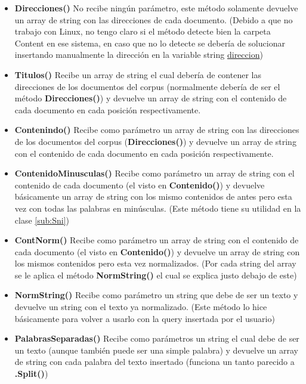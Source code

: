 \documentclass[a4paper,12pt]{article}
\begin{document}
\begin{itemize}
    \item \textbf{Direcciones()}
No recibe ningún parámetro, este método solamente devuelve un array de string con las direcciones de cada documento. (Debido a que no trabajo con Linux, no 
tengo claro si el método detecte bien la carpeta Content en ese sistema, en caso que no lo detecte se debería de solucionar insertando manualmente la dirección 
en la variable string \underline{direccion})

    \item \textbf{Titulos()}
Recibe un array de string el cual debería de contener las direcciones de los documentos del corpus (normalmente debería de ser el método \textbf{Direcciones()}) y devuelve un array de string con el contenido de cada documento en cada posición respectivamente.

     \item \textbf{Contenindo()}
Recibe como parámetro un array de string con las direcciones de los documentos del corpus (\textbf{Direcciones()}) y devuelve un array de string con el contenido de cada documento en cada posición respectivamente.

    \item \textbf{ContenidoMinusculas()}
Recibe como parámetro un array de string con el contenido de cada documento (el visto en \textbf{Contenido()}) y devuelve básicamente un array de string con 
los mismo contenidos de antes pero esta vez con todas las palabras en minúsculas. (Este método tiene su utilidad en la clase \ref{sub:Sni})  

    \item \textbf{ContNorm()}
Recibe como parámetro un array de string con el contenido de cada documento (el visto en \textbf{Contenido()}) y devuelve un array de string con los mismos 
contenidos pero esta vez normalizados. (Por cada string del array se le aplica el método \textbf{NormString()} el cual se explica justo debajo de este)

    \item \textbf{NormString()}
Recibe como parámetro un string que debe de ser un texto y devuelve un string con el texto ya normalizado. (Este método lo hice básicamente para volver a 
usarlo con la query insertada por el usuario)

    \item \textbf{PalabrasSeparadas()}
Recibe como parámetros un string el cual debe de ser un texto (aunque también puede ser una simple palabra) y devuelve un array de string con cada palabra 
del texto insertado (funciona un tanto parecido a \textbf{.Split()})


\end{itemize}
\end{document}
